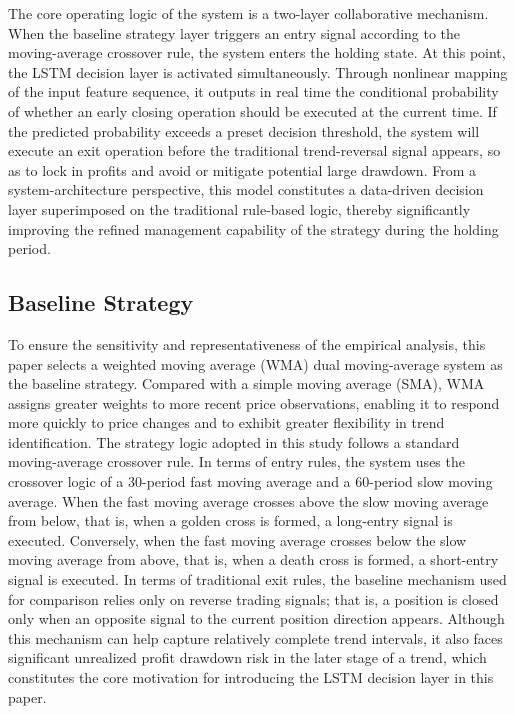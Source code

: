 \documentclass[12pt]{article}
\begin{document}
The core operating logic of the system is a two-layer collaborative mechanism. When the 
baseline strategy layer triggers an entry signal according to the moving-average crossover rule, 
the system enters the holding state. At this point, the LSTM decision layer is activated 
simultaneously. Through nonlinear mapping of the input feature sequence, it outputs in real 
time the conditional probability of whether an early closing operation should be executed at 
the current time. If the predicted probability exceeds a preset decision threshold, the system 
will execute an exit operation before the traditional trend-reversal signal appears, so as to 
lock in profits and avoid or mitigate potential large drawdown. From a system-architecture 
perspective, this model constitutes a data-driven decision layer superimposed on the 
traditional rule-based logic, thereby significantly improving the refined management capability 
of the strategy during the holding period.

\subsection{Baseline Strategy}

To ensure the sensitivity and representativeness of the empirical analysis, this paper selects 
a weighted moving average (WMA) dual moving-average system as the baseline strategy. Compared 
with a simple moving average (SMA), WMA assigns greater weights to more recent price 
observations, enabling it to respond more quickly to price changes and to exhibit greater 
flexibility in trend identification. The strategy logic adopted in this study follows a 
standard moving-average crossover rule. In terms of entry rules, the system uses the crossover 
logic of a 30-period fast moving average and a 60-period slow moving average. When the fast 
moving average crosses above the slow moving average from below, that is, when a golden cross 
is formed, a long-entry signal is executed. Conversely, when the fast moving average crosses 
below the slow moving average from above, that is, when a death cross is formed, a short-entry 
signal is executed. In terms of traditional exit rules, the baseline mechanism used for 
comparison relies only on reverse trading signals; that is, a position is closed only when an 
opposite signal to the current position direction appears. Although this mechanism can help 
capture relatively complete trend intervals, it also faces significant unrealized profit 
drawdown risk in the later stage of a trend, which constitutes the core motivation for 
introducing the LSTM decision layer in this paper.
\end{document}
